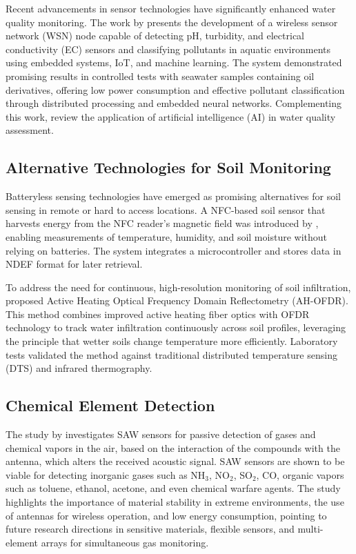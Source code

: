 \documentclass[conference]{IEEEtran}
\begin{document}
Recent advancements in sensor technologies have significantly enhanced water quality monitoring. The work by \cite{ferreira_2023_conception} presents the development of a wireless sensor network (WSN) node capable of detecting pH, turbidity, and electrical conductivity (EC) sensors and classifying pollutants in aquatic environments using embedded systems, IoT, and machine learning. The system demonstrated promising results in controlled tests with seawater samples containing oil derivatives, offering low power consumption and effective pollutant classification through distributed processing and embedded neural networks. Complementing this work, \cite{nr_2025_ai} review the application of artificial intelligence (AI) in water quality assessment.

\subsection{Alternative Technologies for Soil Monitoring}

Batteryless sensing technologies have emerged as promising alternatives for soil sensing in remote or hard to access locations. A NFC-based soil sensor that harvests energy from the NFC reader’s magnetic field was introduced by \cite{boada_2018_batteryless}, enabling measurements of temperature, humidity, and soil moisture without relying on batteries. The system integrates a microcontroller and stores data in NDEF format for later retrieval. 

To address the need for continuous, high-resolution monitoring of soil infiltration, \cite{sun_2024_highresolution} proposed Active Heating Optical Frequency Domain Reflectometry (AH-OFDR). This method combines improved active heating fiber optics with OFDR technology to track water infiltration continuously across soil profiles, leveraging the principle that wetter soils change temperature more efficiently. Laboratory tests validated the method against traditional distributed temperature sensing (DTS) and infrared thermography.



\subsection{Chemical Element Detection}

The study by \cite{devkota_2017_saw} investigates SAW sensors for passive detection of gases and chemical vapors in the air, based on the interaction of the compounds with the antenna, which alters the received acoustic signal. SAW sensors are shown to be viable for detecting inorganic gases such as NH$_3$, NO$_2$, SO$_2$, CO, organic vapors such as toluene, ethanol, acetone, and even chemical warfare agents.
The study highlights the importance of material stability in extreme environments, the use of antennas for wireless operation, and low energy consumption, pointing to future research directions in sensitive materials, flexible sensors, and multi-element arrays for simultaneous gas monitoring.
\end{document}
